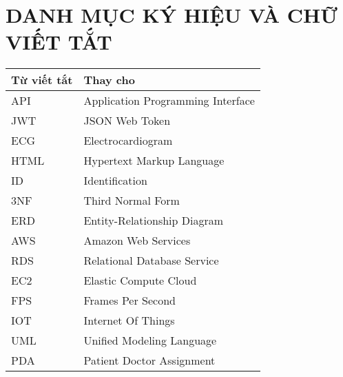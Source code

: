 


\clearpage
\pagestyle{empty} %
{}
\tableofcontents %

\clearpage
\pagestyle{plain} %

\cleardoublepage

\section*{DANH MỤC KÝ HIỆU VÀ CHỮ VIẾT TẮT}%

\begin{table}[H]
  \centering
  \begin{tabularx}{0.85\textwidth}{
  | >{\centering\arraybackslash}m{3cm}
  | >{\centering\arraybackslash}X|
  }
  \hline
  \bfseries Từ viết tắt     &\bfseries Thay cho\hspace{1cm}\\ \hline
  API     & Application Programming Interface \\ \hline
  JWT  & JSON Web Token \\ \hline
  ECG   & Electrocardiogram \\ \hline
  HTML   & Hypertext Markup Language \\ \hline
  ID    & Identification \\ \hline
  3NF   & Third Normal Form \\ \hline
  ERD     & Entity-Relationship Diagram \\ \hline
  AWS  & Amazon Web Services \\ \hline
  RDS   & Relational Database Service \\ \hline
  EC2   & Elastic Compute Cloud \\ \hline
  FPS   & Frames Per Second \\ \hline
  IOT   & Internet Of Things \\ \hline
  UML   & Unified Modeling Language \\ \hline
  PDA   & Patient Doctor Assignment \\ \hline


  
  \end{tabularx}
\end{table}
\cleardoublepage

